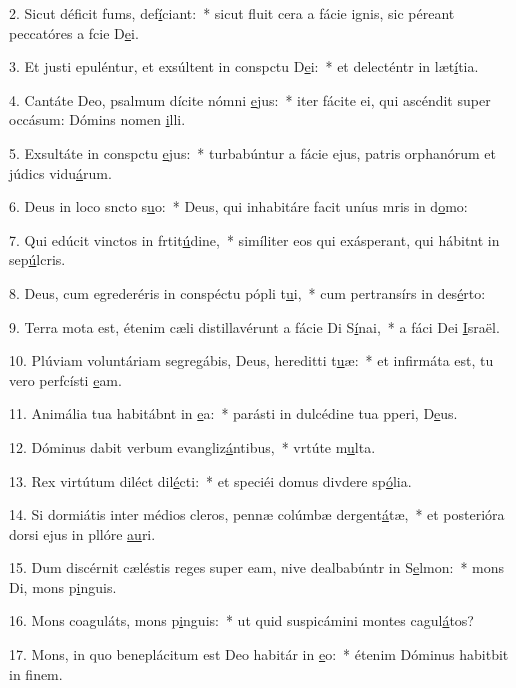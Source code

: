 2. Sicut déficit fums, def\uline{í}ciant:~* sicut fluit cera a fácie ignis, sic péreant peccatóres a fcie D\uline{e}i.\par 
3. Et justi epuléntur, et exsúltent in conspctu D\uline{e}i:~* et delecténtr in læt\uline{í}tia.\par 
4. Cantáte Deo, psalmum dícite nómni \uline{e}jus:~* iter fácite ei, qui ascéndit super occásum: Dómins nomen \uline{i}lli.\par 
5. Exsultáte in conspctu \uline{e}jus:~* turbabúntur a fácie ejus, patris orphanórum et júdics vidu\uline{á}rum.\par 
6. Deus in loco sncto s\uline{u}o:~* Deus, qui inhabitáre facit uníus mris in d\uline{o}mo:\par 
7. Qui edúcit vinctos in frtit\uline{ú}dine,~* simíliter eos qui exásperant, qui hábitnt in sep\uline{ú}lcris.\par 
8. Deus, cum egrederéris in conspéctu pópli t\uline{u}i,~* cum pertransírs in des\uline{é}rto:\par 
9. Terra mota est, étenim cæli distillavérunt a fácie Di S\uline{í}nai,~* a fáci Dei \uline{I}sraël.\par 
10. Plúviam voluntáriam segregábis, Deus, hereditti t\uline{u}æ:~* et infirmáta est, tu vero perfcísti \uline{e}am.\par 
11. Animália tua habitábnt in \uline{e}a:~* parásti in dulcédine tua pperi, D\uline{e}us.\par 
12. Dóminus dabit verbum evangliz\uline{á}ntibus,~* vrtúte m\uline{u}lta.\par 
13. Rex virtútum diléct dil\uline{é}cti:~* et speciéi domus divdere sp\uline{ó}lia.\par 
14. Si dormiátis inter médios cleros, pennæ colúmbæ dergent\uline{á}tæ,~* et posterióra dorsi ejus in pllóre \uline{au}ri.\par 
15. Dum discérnit cæléstis reges super eam, nive dealbabúntr in S\uline{e}lmon:~* mons Di, mons p\uline{i}nguis.\par 
16. Mons coaguláts, mons p\uline{i}nguis:~* ut quid suspicámini montes cagul\uline{á}tos?\par 
17. Mons, in quo beneplácitum est Deo habitár in \uline{e}o:~* étenim Dóminus habitbit in f\uline{i}nem.\par 
